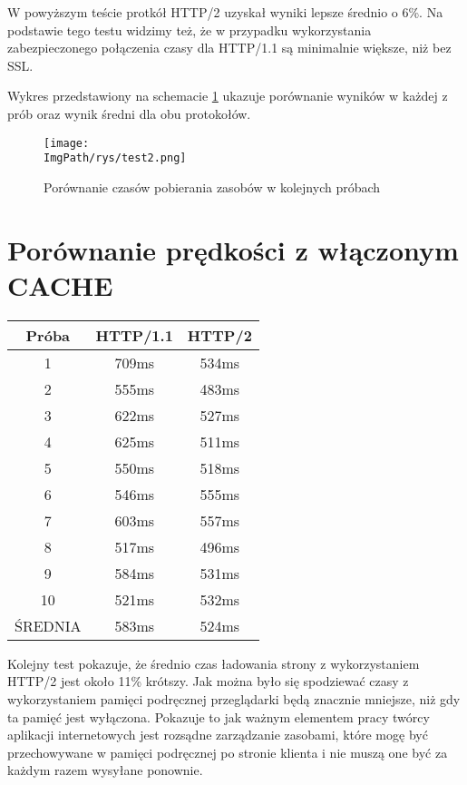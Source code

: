 \documentclass[a4paper,12pt,twoside,openany]{report}
\newcommand{\ImgPath}{.}
\begin{document}
W powyższym teście protkół HTTP/2 uzyskał wyniki lepsze średnio o 6\%.
Na podstawie tego testu widzimy też, że w przypadku wykorzystania zabezpieczonego połączenia czasy dla HTTP/1.1 są minimalnie większe, niż bez SSL.

Wykres przedstawiony na schemacie \ref{schematTest2} ukazuje porównanie wyników w każdej z prób oraz wynik średni dla obu protokołów.

\begin{figure}[!htbp]
	\begin{center}
\centering
\texttt{[image: \\ImgPath/rys/test2.png]}
\end{center}
	\caption{Porównanie czasów pobierania zasobów w kolejnych próbach}
	\label{schematTest2}
\end{figure}

\section{Porównanie prędkości z włączonym CACHE}

\begin{tabular}{c|c|c}
Próba & HTTP/1.1 & HTTP/2 \\ \hline
1 & 709ms & 534ms \\
2 & 555ms & 483ms \\
3 & 622ms & 527ms \\
4 & 625ms & 511ms \\
5 & 550ms & 518ms \\
6 & 546ms & 555ms \\
7 & 603ms & 557ms \\
8 & 517ms & 496ms \\
9 & 584ms & 531ms \\
10 & 521ms & 532ms \\ \hline
ŚREDNIA & 583ms & 524ms \\
\end{tabular}

Kolejny test pokazuje, że średnio czas ładowania strony z wykorzystaniem HTTP/2 jest około 11\% krótszy.
Jak można było się spodziewać czasy z wykorzystaniem pamięci podręcznej przeglądarki będą znacznie mniejsze, niż gdy ta pamięć jest wyłączona.
Pokazuje to jak ważnym elementem pracy twórcy aplikacji internetowych jest rozsądne zarządzanie zasobami, które mogę być przechowywane w pamięci podręcznej po stronie klienta i nie muszą one być za każdym razem wysyłane ponownie.
\end{document}
